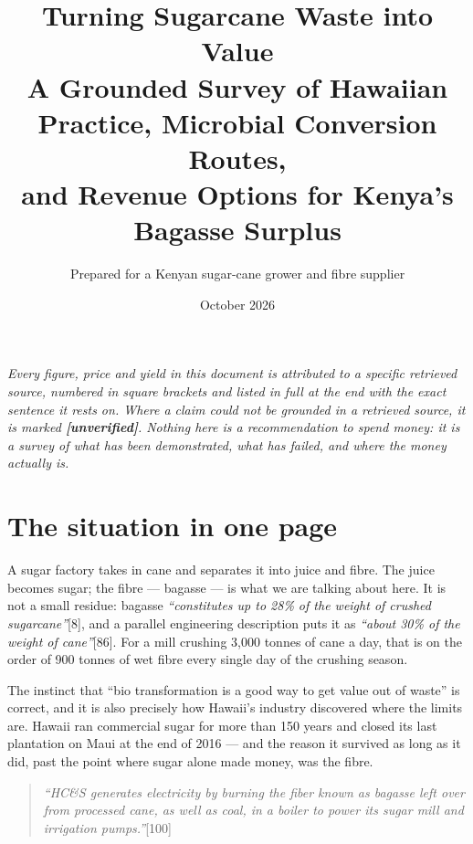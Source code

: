 \documentclass[11pt]{article}
\title{\vspace{-2.2em}\textbf{Turning Sugarcane Waste into Value}\\[0.35em]
\large A Grounded Survey of Hawaiian Practice, Microbial Conversion Routes,\\
and Revenue Options for Kenya's Bagasse Surplus}
\author{Prepared for a Kenyan sugar-cane grower and fibre supplier}
\date{October 2026}
\newcommand{\src}[1]{[#1]}
\begin{document}
\maketitle
\vspace{-1.2em}

\begin{center}
\begin{minipage}{0.92\textwidth}
\small\itshape
Every figure, price and yield in this document is attributed to a specific
retrieved source, numbered in square brackets and listed in full at the end
with the exact sentence it rests on. Where a claim could not be grounded in a
retrieved source, it is marked \textbf{[unverified]}. Nothing here is a
recommendation to spend money: it is a survey of what has been demonstrated,
what has failed, and where the money actually is.
\end{minipage}
\end{center}

\vspace{0.6em}

\section{The situation in one page}

A sugar factory takes in cane and separates it into juice and fibre. The juice
becomes sugar; the fibre --- bagasse --- is what we are talking about here. It
is not a small residue: bagasse \emph{``constitutes up to 28\% of the weight of
crushed sugarcane''}\src{8}, and a parallel engineering description puts it as
\emph{``about 30\% of the weight of cane''}\src{86}. For a mill crushing 3{,}000
tonnes of cane a day, that is on the order of 900 tonnes of wet fibre every
single day of the crushing season.

The instinct that ``bio transformation is a good way to get value out of
waste'' is correct, and it is also precisely how Hawaii's industry discovered
where the limits are. Hawaii ran commercial sugar for more than 150 years and
closed its last plantation on Maui at the end of 2016 --- and the reason it
survived as long as it did, past the point where sugar alone made money, was
the fibre.

\begin{quote}
\emph{``HC\&S generates electricity by burning the fiber known as bagasse left
over from processed cane, as well as coal, in a boiler to power its sugar mill
and irrigation pumps.''}\src{100}
\end{quote}
\end{document}
